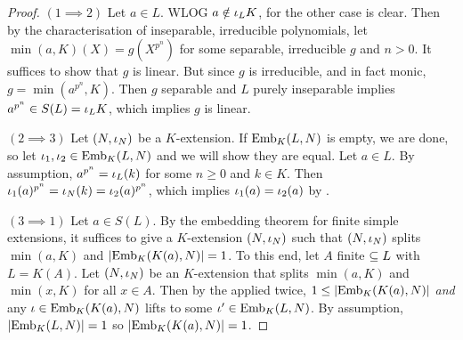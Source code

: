 \documentclass[main.tex]{subfiles}
\begin{document}
\begin{proof}
  $(1 \implies 2)$ Let $a \in L$. 
  WLOG $a \notin \iota_L K$, for the other case is clear. 
  Then by the 
  {characterisation of inseparable, irreducible polynomials}, 
  let $\min(a,K)(X) = g(X^{p^n})$ for some separable, irreducible $g$
  and $n > 0$. 
  It suffices to show that $g$ is linear. 
  But since $g$ is irreducible, and in fact monic, 
  $g = \min(a^{p^n},K)$. 
  Then $g$ separable and $L$ purely inseparable implies 
  $a^{p^n} \in S(L) = \iota_L K$, 
  which implies $g$ is linear. 

  $(2\implies 3)$ Let $(N,\iota_N)$ be a $K$-extension.
  If $\mathrm{Emb}_{K}(L, N)$ is empty, we are done, 
  so let $\iota_1,\iota_2 \in \mathrm{Emb}_{K}(L, N)$ and we will show they are equal. 
  Let $a \in L$. 
  By assumption, $a^{p^n} = \iota_L(k)$ for some $n\geq 0$ and $k \in K$.  
  Then $\iota_1(a)^{p^n} = \iota_N(k) = \iota_2(a)^{p^n}$,
  which implies $\iota_1(a) = \iota_2(a)$ by . 

  $(3 \implies 1)$ Let $a \in S(L)$. 
  By the 
  {embedding theorem for finite simple extensions},
  it suffices to give a $K$-extension $(N,\iota_N)$ such that 
  $(N,\iota_N)$ splits $\min(a,K)$ and $|\mathrm{Emb}_{K}(K(a), N)| = 1$.
  To this end, let $A$ finite $\subseteq L$ with $L = K(A)$. 
  Let $(N,\iota_N)$ be an $K$-extension that splits $\min(a,K)$ and 
  $\min(x,K)$ for all $x \in A$. 
  Then by the 
  applied twice,
  $1 \leq |\mathrm{Emb}_{K}(K(a), N)|$ \emph{and}
  any $\iota \in \mathrm{Emb}_{K}(K(a), N)$ lifts to some $\iota' \in \mathrm{Emb}_{K}(L, N)$. 
  By assumption, $|\mathrm{Emb}_{K}(L, N)| = 1$ so $|\mathrm{Emb}_{K}(K(a), N)| = 1$.


\end{proof}
\end{document}
